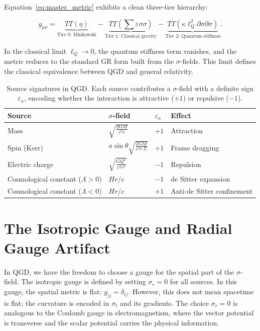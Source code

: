 \documentclass[12pt,prd,preprintnumbers,amsmath,amssymb]{revtex4-2}
\theoremstyle{definition}
\theoremstyle{remark}
\begin{document}
Equation~\eqref{eq:master_metric} exhibits a clean three-tier hierarchy:

\[
g_{\mu\nu} = \underbrace{T T(\eta)}_{\text{Tier 0: Minkowski}} - \underbrace{T T(\sum\varepsilon\sigma\sigma)}_{\text{Tier 1: Classical gravity}} - \underbrace{T T(\kappa\ell_Q^2\partial\sigma\partial\sigma)}_{\text{Tier 2: Quantum stiffness}}.
\]

In the classical limit $\ell_Q \to 0$, the quantum stiffness term vanishes, and the metric reduces to the standard GR form built from the $\sigma$-fields. This limit defines the classical equivalence between QGD and general relativity.

\begin{table}[h]
\centering
\caption{Source signatures in QGD. Each source contributes a $\sigma$-field with a definite sign $\varepsilon_a$, encoding whether the interaction is attractive ($+1$) or repulsive ($-1$).}
\label{tab:sources}
\begin{tabular}{llll}
\toprule
Source & $\sigma$-field & $\varepsilon_a$ & Effect \\
\midrule
Mass & $\displaystyle\sqrt{\frac{2GM}{c^2 r}}$ & $+1$ & Attraction \\
Spin (Kerr) & $\displaystyle a\sin\theta\sqrt{\frac{2GM}{c^2 r\,\Sigma}}$ & $+1$ & Frame dragging \\
Electric charge & $\displaystyle\sqrt{\frac{GQ^2}{c^4 r^2}}$ & $-1$ & Repulsion \\
Cosmological constant ($\Lambda>0$) & $\displaystyle Hr/c$ & $-1$ & de Sitter expansion \\
Cosmological constant ($\Lambda<0$) & $\displaystyle Hr/c$ & $+1$ & Anti-de Sitter confinement \\
\bottomrule
\end{tabular}
\end{table}

\section{The Isotropic Gauge and Radial Gauge Artifact}

In QGD, we have the freedom to choose a gauge for the spatial part of the $\sigma$-field. The isotropic gauge is defined by setting $\sigma_r = 0$ for all sources. In this gauge, the spatial metric is flat: $g_{ij} = \delta_{ij}$. However, this does not mean spacetime is flat; the curvature is encoded in $\sigma_t$ and its gradients. The choice $\sigma_r = 0$ is analogous to the Coulomb gauge in electromagnetism, where the vector potential is transverse and the scalar potential carries the physical information.
\end{document}
